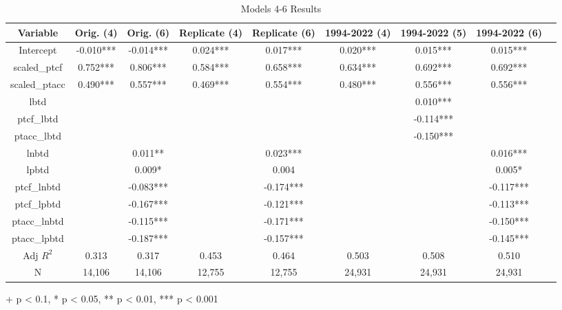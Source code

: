 \documentclass{article}
\begin{document}
\begin{table}[htbp]
\centering
\caption{Models 4-6 Results}
\label{tab:Models_4_6_Results}
\begin{adjustbox}{max width=\textwidth}
\begin{tabular}{|c|c|c|c|c|c|c|c|c|}
\hline
Variable & Orig. (4) & Orig. (6) & Replicate (4) & Replicate (6) & 1994-2022 (4) & 1994-2022 (5) & 1994-2022 (6) \\
\hline
Intercept & -0.010*** & -0.014*** & 0.024*** & 0.017*** & 0.020*** & 0.015*** & 0.015*** \\
scaled\_ptcf & 0.752*** & 0.806*** & 0.584*** & 0.658*** & 0.634*** & 0.692*** & 0.692*** \\
scaled\_ptacc & 0.490*** & 0.557*** & 0.469*** & 0.554*** & 0.480*** & 0.556*** & 0.556*** \\
lbtd &  &  &  &  &  & 0.010*** & \\
ptcf\_lbtd &  &  &  &  &  & -0.114*** &  \\
ptacc\_lbtd &  &  &  &  &  & -0.150*** &  \\
lnbtd &  & 0.011** &  & 0.023*** &  &  & 0.016*** \\
lpbtd &  & 0.009* &  & 0.004 &  &  & 0.005* \\
ptcf\_lnbtd &  & -0.083*** &  & -0.174*** &  &  & -0.117*** \\
ptcf\_lpbtd &  & -0.167*** &  & -0.121*** &  &  & -0.113*** \\
ptacc\_lnbtd &  & -0.115*** &  & -0.171*** &  &  & -0.150*** \\
ptacc\_lpbtd &  & -0.187*** &  & -0.157*** &  &  & -0.145*** \\
\hline
Adj $R^2$ & 0.313 & 0.317 & 0.453 & 0.464 & 0.503 & 0.508 & 0.510 \\
\hline
N & 14,106 & 14,106 & 12,755 & 12,755 & 24,931 & 24,931 & 24,931 \\
\hline
\end{tabular}
\end{adjustbox}
\footnotesize{+ p < 0.1, * p < 0.05, ** p < 0.01, *** p < 0.001}
\end{table}
\end{document}
